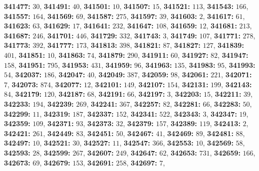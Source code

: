 \textsf{\bfseries 341477:} $30$, \textsf{\bfseries 341491:} $40$, \textsf{\bfseries 341501:} $10$, \textsf{\bfseries 341507:} $15$, \textsf{\bfseries 341521:} $113$, \textsf{\bfseries 341543:} $166$, \textsf{\bfseries 341557:} $164$, \textsf{\bfseries 341569:} $69$, \textsf{\bfseries 341587:} $275$, \textsf{\bfseries 341597:} $39$, \textsf{\bfseries 341603:} $2$, \textsf{\bfseries 341617:} $61$, \textsf{\bfseries 341623:} $63$, \textsf{\bfseries 341629:} $17$, \textsf{\bfseries 341641:} $232$, \textsf{\bfseries 341647:} $108$, \textsf{\bfseries 341659:} $12$, \textsf{\bfseries 341681:} $213$, \textsf{\bfseries 341687:} $246$, \textsf{\bfseries 341701:} $446$, \textsf{\bfseries 341729:} $332$, \textsf{\bfseries 341743:} $3$, \textsf{\bfseries 341749:} $107$, \textsf{\bfseries 341771:} $278$, \textsf{\bfseries 341773:} $392$, \textsf{\bfseries 341777:} $173$, \textsf{\bfseries 341813:} $398$, \textsf{\bfseries 341821:} $87$, \textsf{\bfseries 341827:} $127$, \textsf{\bfseries 341839:} $401$, \textsf{\bfseries 341851:} $10$, \textsf{\bfseries 341863:} $74$, \textsf{\bfseries 341879:} $290$, \textsf{\bfseries 341911:} $60$, \textsf{\bfseries 341927:} $82$, \textsf{\bfseries 341947:} $158$, \textsf{\bfseries 341951:} $795$, \textsf{\bfseries 341953:} $431$, \textsf{\bfseries 341959:} $96$, \textsf{\bfseries 341963:} $135$, \textsf{\bfseries 341983:} $95$, \textsf{\bfseries 341993:} $54$, \textsf{\bfseries 342037:} $186$, \textsf{\bfseries 342047:} $40$, \textsf{\bfseries 342049:} $387$, \textsf{\bfseries 342059:} $98$, \textsf{\bfseries 342061:} $221$, \textsf{\bfseries 342071:} $7$, \textsf{\bfseries 342073:} $874$, \textsf{\bfseries 342077:} $12$, \textsf{\bfseries 342101:} $149$, \textsf{\bfseries 342107:} $154$, \textsf{\bfseries 342131:} $199$, \textsf{\bfseries 342143:} $84$, \textsf{\bfseries 342179:} $120$, \textsf{\bfseries 342187:} $68$, \textsf{\bfseries 342191:} $66$, \textsf{\bfseries 342197:} $3$, \textsf{\bfseries 342203:} $15$, \textsf{\bfseries 342211:} $39$, \textsf{\bfseries 342233:} $194$, \textsf{\bfseries 342239:} $269$, \textsf{\bfseries 342241:} $367$, \textsf{\bfseries 342257:} $82$, \textsf{\bfseries 342281:} $66$, \textsf{\bfseries 342283:} $50$, \textsf{\bfseries 342299:} $11$, \textsf{\bfseries 342319:} $187$, \textsf{\bfseries 342337:} $152$, \textsf{\bfseries 342341:} $522$, \textsf{\bfseries 342343:} $3$, \textsf{\bfseries 342347:} $19$, \textsf{\bfseries 342359:} $109$, \textsf{\bfseries 342371:} $93$, \textsf{\bfseries 342373:} $32$, \textsf{\bfseries 342379:} $157$, \textsf{\bfseries 342389:} $119$, \textsf{\bfseries 342413:} $2$, \textsf{\bfseries 342421:} $261$, \textsf{\bfseries 342449:} $83$, \textsf{\bfseries 342451:} $50$, \textsf{\bfseries 342467:} $41$, \textsf{\bfseries 342469:} $89$, \textsf{\bfseries 342481:} $88$, \textsf{\bfseries 342497:} $10$, \textsf{\bfseries 342521:} $30$, \textsf{\bfseries 342527:} $11$, \textsf{\bfseries 342547:} $366$, \textsf{\bfseries 342553:} $10$, \textsf{\bfseries 342569:} $58$, \textsf{\bfseries 342593:} $28$, \textsf{\bfseries 342599:} $267$, \textsf{\bfseries 342607:} $249$, \textsf{\bfseries 342647:} $62$, \textsf{\bfseries 342653:} $731$, \textsf{\bfseries 342659:} $166$, \textsf{\bfseries 342673:} $69$, \textsf{\bfseries 342679:} $153$, \textsf{\bfseries 342691:} $258$, \textsf{\bfseries 342697:} $7$, 
